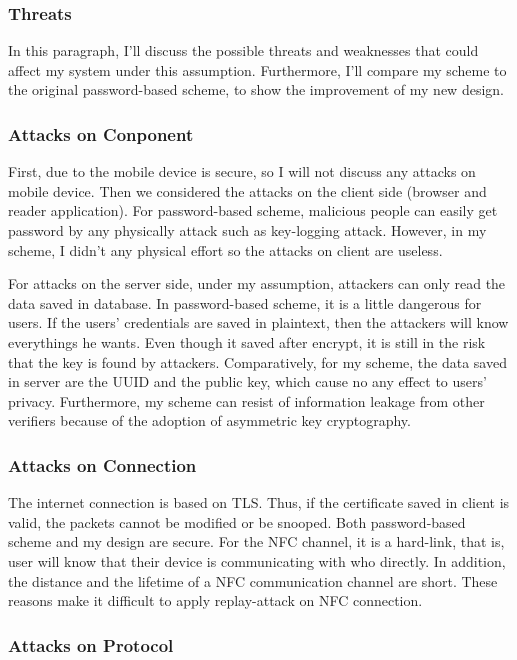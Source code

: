\begin{CJK}{Bg5}{bsmi}
\subsubsection{Threats}

In this paragraph, I'll discuss the possible threats and weaknesses that could affect my system under this assumption. Furthermore, I'll compare my scheme to the original password-based scheme, to show the improvement of my new design.

\subsubsection{Attacks on Conponent}

First, due to the mobile device is secure, so I will not discuss any attacks on mobile device. Then we considered the attacks on the client side (browser and reader application). For password-based scheme, malicious people can easily get password by any physically attack such as key-logging attack. However, in my scheme, I didn't any physical effort so the attacks on client are useless.

For attacks on the server side, under my assumption, attackers can only read the data saved in database. In password-based scheme, it is a little dangerous for users. If the users' credentials are saved in plaintext, then the attackers will know everythings he wants. Even though it saved after encrypt, it is still in the risk that the key is found by attackers. Comparatively, for my scheme, the data saved in server are the UUID and the public key, which cause no any effect to users' privacy. Furthermore, my scheme can resist of information leakage from other verifiers because of the adoption of asymmetric key cryptography.

\subsubsection{Attacks on Connection}

The internet connection is based on TLS. Thus, if the certificate saved in client is valid, the packets cannot be modified or be snooped. Both password-based scheme and my design are secure. For the NFC channel, it is a hard-link, that is, user will know that their device is communicating with who directly. In addition, the distance and the lifetime of a NFC communication channel are short. These reasons make it difficult to apply replay-attack on NFC connection. 

\subsubsection{Attacks on Protocol}


\end{CJK}
